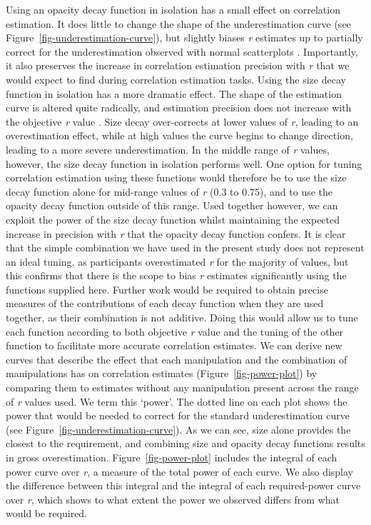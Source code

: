 \documentclass[manuscript, review, anonymous, screen]{acmart}
\begin{document}
Using an opacity decay function in isolation has a small effect on
correlation estimation. It does little to change the shape of the
underestimation curve (see Figure~\ref{fig-underestimation-curve}), but
slightly biases \emph{r} estimates up to partially correct for the
underestimation observed with normal scatterplots \citep{strain_2023}.
Importantly, it also preserves the increase in correlation estimation
precision with \emph{r} that we would expect to find during correlation
estimation tasks. Using the size decay function in isolation has a more
dramatic effect. The shape of the estimation curve is altered quite
radically, and estimation precision does not increase with the objective
\emph{r} value \citep{strain_2023b}. Size decay over-corrects at lower
values of \emph{r}, leading to an overestimation effect, while at high
values the curve begins to change direction, leading to a more severe
underestimation. In the middle range of \emph{r} values, however, the
size decay function in isolation performs well. One option for tuning
correlation estimation using these functions would therefore be to use
the size decay function alone for mid-range values of \emph{r} (0.3 to
0.75), and to use the opacity decay function outside of this range. Used
together however, we can exploit the power of the size decay function
whilst maintaining the expected increase in precision with \emph{r} that
the opacity decay function confers. It is clear that the simple
combination we have used in the present study does not represent an
ideal tuning, as participants overestimated \emph{r} for the majority of
values, but this confirms that there is the scope to bias \emph{r}
estimates significantly using the functions supplied here. Further work
would be required to obtain precise measures of the contributions of
each decay function when they are used together, as their combination is
not additive. Doing this would allow us to tune each function according
to both objective \emph{r} value and the tuning of the other function to
facilitate more accurate correlation estimates. We can derive new curves
that describe the effect that each manipulation and the combination of
manipulations has on correlation estimates (Figure~\ref{fig-power-plot})
by comparing them to estimates without any manipulation present across
the range of \emph{r} values used. We term this `power'. The dotted line
on each plot shows the power that would be needed to correct for the
standard underestimation curve (see
Figure~\ref{fig-underestimation-curve}). As we can see, size alone
provides the closest to the requirement, and combining size and opacity
decay functions results in gross overestimation.
Figure~\ref{fig-power-plot} includes the integral of each power curve
over \emph{r}, a measure of the total power of each curve. We also
display the difference between this integral and the integral of each
required-power curve over \emph{r}, which shows to what extent the power
we observed differs from what would be required.
\end{document}
